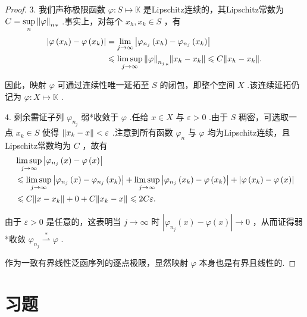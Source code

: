 \begin{proof}
3. 我们声称极限函数 $\varphi  : S \mapsto  \mathbb{K}$ 是Lipschitz连续的，其Lipschitz常数为 $C = \mathop{\sup }\limits_{n}{\norm{\varphi }_{n}}_{ * }$ .事实上，对每个 ${x}_{h},{x}_{k} \in  S$ ，有
\begin{align*}
\left| {\varphi \left( {x}_{h}\right)  - \varphi \left( {x}_{k}\right) }\right|  &= \lim_{{j \rightarrow  \infty }}\left| {{\varphi }_{{n}_{j}}\left( {x}_{h}\right)  - {\varphi }_{{n}_{j}}\left( {x}_{k}\right) }\right| \\
&\leqslant  \limsup_{{j \rightarrow  \infty }}{\norm{\varphi }_{{n}_{j}}}_{ * }\norm{{x}_{h} - {x}_{k}} \leqslant  C\norm{{x}_{h} - {x}_{k}}.
\end{align*}

因此，映射 $\varphi$ 可通过连续性唯一延拓至 $S$ 的闭包，即整个空间 $X$ .该连续延拓仍记为 $\varphi  : X \mapsto  \mathbb{K}$ .

4. 剩余需证子列 ${\varphi }_{{n}_{j}}$ 弱*收敛于 $\varphi$ .任给 $x \in  X$ 与 $\varepsilon  > 0$ .由于 $S$ 稠密，可选取一点 ${x}_{k} \in  S$ 使得 $\norm{{x}_{k} - x} < \varepsilon$ .注意到所有函数 ${\varphi }_{n}$ 与 $\varphi$ 均为Lipschitz连续，且Lipschitz常数均为 $C$ ，故有
\begin{align*}
&\mathop{\limsup }\limits_{{j \rightarrow  \infty }}\left| {{\varphi }_{{n}_{j}}\left( x\right)  - \varphi \left( x\right) }\right|\\
&\leqslant  \mathop{\limsup }\limits_{{j \rightarrow  \infty }}\left| {{\varphi }_{{n}_{j}}\left( x\right)  - {\varphi }_{{n}_{j}}\left( {x}_{k}\right) }\right|
+ \mathop{\limsup }\limits_{{j \rightarrow  \infty }}\left| {{\varphi }_{{n}_{j}}\left( {x}_{k}\right)  - \varphi \left( {x}_{k}\right) }\right|  + \left| {\varphi \left( {x}_{k}\right)  - \varphi \left( x\right) }\right|\\
&\leqslant  C\norm{x - {x}_{k}} + 0 + C\norm{{x}_{k} - x} \leqslant  {2C\varepsilon }.
\end{align*}


由于 $\varepsilon  > 0$ 是任意的，这表明当 $j \rightarrow  \infty$ 时 $\left| {{\varphi }_{{n}_{j}}\left( x\right)  - \varphi \left( x\right) }\right|  \rightarrow  0$ ，从而证得弱*收敛 ${\varphi }_{{n}_{j}}\overset{ * }{ \rightharpoonup  }\varphi$ .

作为一致有界线性泛函序列的逐点极限，显然映射 $\varphi$ 本身也是有界且线性的.
\end{proof}

\section{习题}

